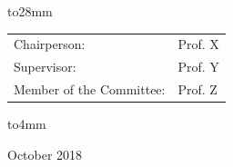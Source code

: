 \begin{singlespace}
{\vbox to28mm{
\vfil
{\large
\begin{center}
\begin{tabular}{p{}l}
Chairperson: &  Prof. X \\
Supervisor: & Prof. Y\\
Member of the Committee: & Prof. Z \\
\end{tabular}
\end{center}
}
\vfil
}%
\vskip28mm%
\vbox to4mm{\Large\bf
\vfil
\begin{center}
October 2018
\end{center}
\vfil
}%
}%
\end{singlespace}
\null\newpage